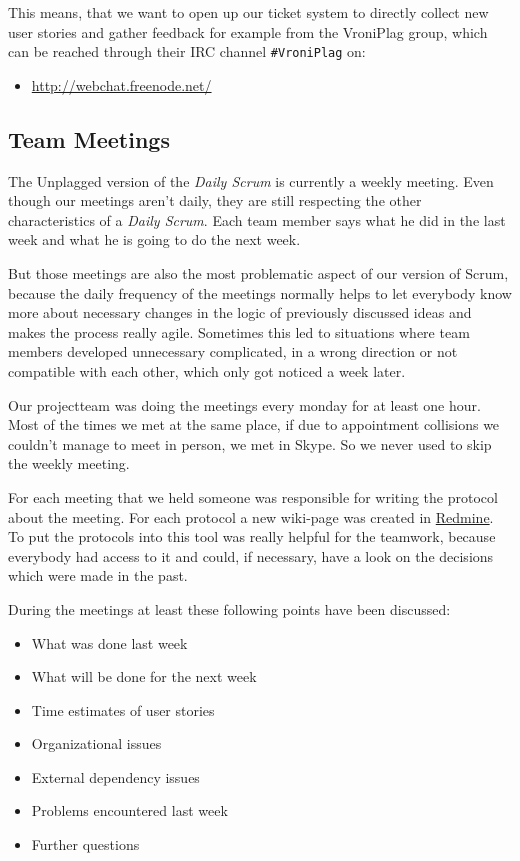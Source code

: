 This means, that we want to open up our ticket system to directly collect new user stories and gather feedback for 
example from the VroniPlag group, which can be reached through their IRC channel \texttt{\#VroniPlag} on:

\begin{itemize}
\item \url{http://webchat.freenode.net/}
\end{itemize} 


\subsection{Team Meetings}

The Unplagged version of the \textit{Daily Scrum} is currently a weekly meeting. Even though our meetings aren't daily, they 
are still respecting the other characteristics of a \textit{Daily Scrum}. Each team member says what he did in 
the last week and what he is going to do the next week. 

But those meetings are also the most problematic aspect of our version of Scrum, because the daily frequency of the 
meetings normally 
helps to let everybody know more about necessary changes in the logic of previously discussed ideas and makes the 
process
really agile. Sometimes this led to situations where team members developed unnecessary complicated, in a wrong direction
or not compatible with each other, which only got noticed a week later.

Our projectteam was doing the meetings every monday for at least one hour. Most of the times we met at the same place, 
if due to appointment collisions we couldn't manage to meet in person, we met in Skype. So we never used to skip the 
weekly meeting.

For each meeting that we held someone was responsible for writing the protocol about the meeting. For each protocol a 
new wiki-page was created in \href{http://www.redmine.org/}{Redmine}. To put the protocols into this tool
was really helpful for the teamwork, because everybody had access to it and could, 
if necessary, have a look on the decisions which were made in the past.

During the meetings at least these following points have been discussed:

\begin{itemize}
\item What was done last week 
\item What will be done for the next week
\item Time estimates of user stories
\item Organizational issues
\item External dependency issues
\item Problems encountered last week
\item Further questions
\end{itemize}

